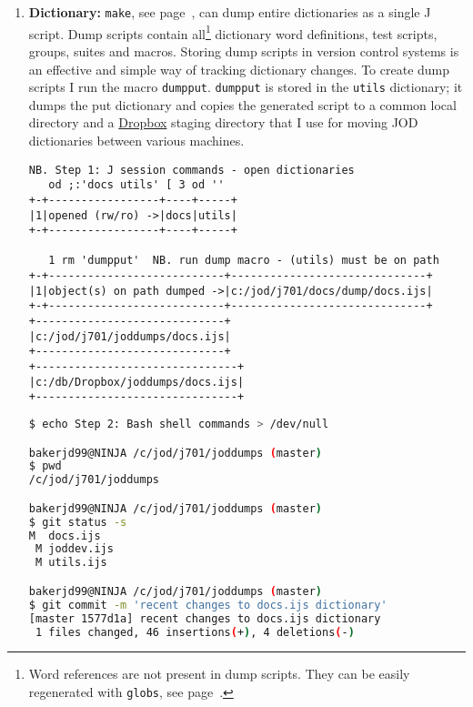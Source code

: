 \begin{enumerate}
\item \textbf{Dictionary:}\label{it:dictlev} \texttt{make}, see page~\pageref{ss:make}, can dump entire
dictionaries as a single J script. Dump scripts contain all\footnote{Word references 
are not present in dump scripts. They can
be easily regenerated with \texttt{globs}, see page~\pageref{ss:globs}.} dictionary word definitions,
test scripts, groups, suites and macros. Storing dump scripts in version control systems is
an effective and simple way of tracking dictionary changes.  To create dump scripts I run
the macro \texttt{dumpput}.
\texttt{dumpput} is stored in the \texttt{utils} dictionary; it dumps the put dictionary and
copies the generated script to a common local directory and a \href{http://www.dropbox.com/}{Dropbox} \cite{dropbsite}
staging directory that I
use for moving JOD dictionaries between various machines.

\begin{lstlisting}[frame=single,framerule=0pt,basicstyle=\ttfamily\footnotesize]
   NB. Step 1: J session commands - open dictionaries
   od ;:'docs utils' [ 3 od ''
+-+-----------------+----+-----+
|1|opened (rw/ro) ->|docs|utils|
+-+-----------------+----+-----+
   
   1 rm 'dumpput'  NB. run dump macro - (utils) must be on path
+-+---------------------------+------------------------------+
|1|object(s) on path dumped ->|c:/jod/j701/docs/dump/docs.ijs|
+-+---------------------------+------------------------------+
+-----------------------------+
|c:/jod/j701/joddumps/docs.ijs|
+-----------------------------+
+-------------------------------+
|c:/db/Dropbox/joddumps/docs.ijs|
+-------------------------------+
\end{lstlisting}

\begin{lstlisting}[language=bash,frame=single,framerule=0pt
,basicstyle=\ttfamily\footnotesize,backgroundcolor=\color{CodeBackGround}]
$ echo Step 2: Bash shell commands > /dev/null

bakerjd99@NINJA /c/jod/j701/joddumps (master)
$ pwd
/c/jod/j701/joddumps

bakerjd99@NINJA /c/jod/j701/joddumps (master)
$ git status -s
M  docs.ijs
 M joddev.ijs
 M utils.ijs

bakerjd99@NINJA /c/jod/j701/joddumps (master)
$ git commit -m 'recent changes to docs.ijs dictionary'
[master 1577d1a] recent changes to docs.ijs dictionary
 1 files changed, 46 insertions(+), 4 deletions(-)
\end{lstlisting}


\end{enumerate}
